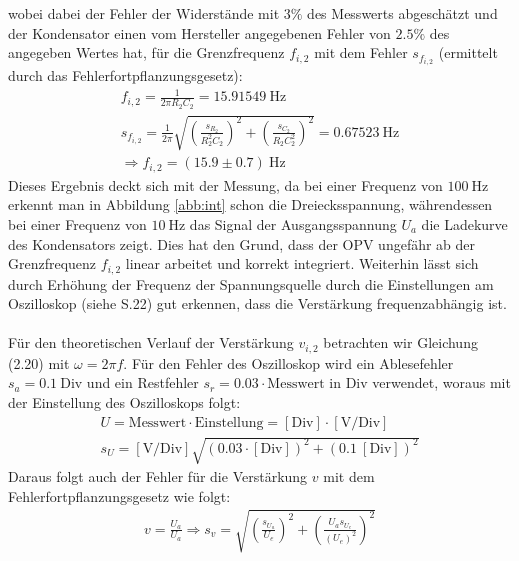 wobei dabei der Fehler der Widerstände mit $3\%$ des Messwerts abgeschätzt und der Kondensator einen vom Hersteller angegebenen Fehler von $2.5\%$ des angegeben Wertes hat, für die Grenzfrequenz $f_{i,2}$ mit dem Fehler $s_{f_{i,2}}$ (ermittelt durch das Fehlerfortpflanzungsgesetz):
\begin{gather}
    f_{i,2} = \frac{1}{2\pi R_2 C_2} = 15.91549~\text{Hz}\\[0.5cm]
    s_{f_{i,2}} = \frac{1}{2\pi}\sqrt{\left(\frac{s_{R_2}}{R_2^2 C_2}\right)^2 + \left(\frac{s_{C_2}}{R_2 C_2^2}\right)^2} = 0.67523~\text{Hz}\\[0.5cm]
    \Rightarrow \boxed{f_{i,2} = (15.9 \pm 0.7)~\text{Hz}}
\end{gather}
Dieses Ergebnis deckt sich mit der Messung, da bei einer Frequenz von $100~\text{Hz}$ erkennt man in Abbildung \ref{abb:int} schon die Dreiecksspannung, währendessen bei einer Frequenz von $10~\text{Hz}$ das Signal der Ausgangsspannung $U_a$ die Ladekurve des Kondensators zeigt. Dies hat den Grund, dass der OPV ungefähr ab der Grenzfrequenz $f_{i,2}$ linear arbeitet und korrekt integriert. Weiterhin lässt sich durch Erhöhung der Frequenz der Spannungsquelle durch die Einstellungen am Oszilloskop (siehe S.22) gut erkennen, dass die Verstärkung frequenzabhängig ist.\\
 \\
Für den theoretischen Verlauf der Verstärkung $v_{i,2}$ betrachten wir Gleichung (2.20) mit $\omega = 2\pi f$.
Für den Fehler des Oszilloskop wird ein Ablesefehler $s_a = 0.1~\text{Div}$ und ein Restfehler $s_r = 0.03\cdot\text{Messwert in Div}$ verwendet, woraus mit der Einstellung des Oszilloskops folgt:
\begin{gather}
    U = \text{Messwert}\cdot\text{Einstellung} = [\text{Div}]\cdot[\text{V/Div}]\\
    s_U = [\text{V/Div}]\sqrt{(0.03\cdot [\text{Div}])^2 + (0.1~[\text{Div}])^2} 
\end{gather}
Daraus folgt auch der Fehler für die Verstärkung $v$ mit dem Fehlerfortpflanzungsgesetz wie folgt:
\begin{gather}
    v = \frac{U_a}{U_a} \Rightarrow s_v = \sqrt{\left(\frac{s_{U_a}}{U_e}\right)^2 + \left(\frac{U_a s_{U_e}}{(U_e)^2}\right)^2}
\end{gather}
